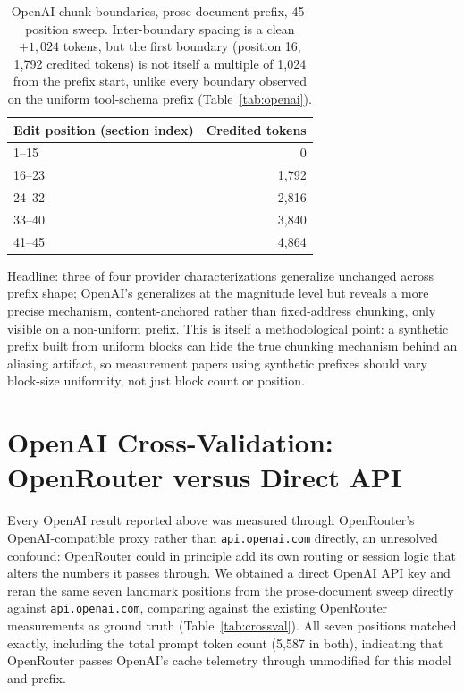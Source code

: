 \documentclass[11pt]{article}
\newcommand{\code}[1]{\texttt{#1}}
\begin{document}
\begin{table}[t]
\centering
\caption{OpenAI chunk boundaries, prose-document prefix, 45-position sweep.
Inter-boundary spacing is a clean $+1{,}024$ tokens, but the first boundary
(position 16, 1{,}792 credited tokens) is not itself a multiple of 1{,}024
from the prefix start, unlike every boundary observed on the uniform
tool-schema prefix (Table~\ref{tab:openai}).}
\label{tab:doc-openai}
\begin{tabular}{@{}lr@{}}
\toprule
Edit position (section index) & Credited tokens \\
\midrule
1--15  & 0 \\
16--23 & 1{,}792 \\
24--32 & 2{,}816 \\
33--40 & 3{,}840 \\
41--45 & 4{,}864 \\
\bottomrule
\end{tabular}
\end{table}

Headline: three of four provider characterizations generalize unchanged
across prefix shape; OpenAI's generalizes at the magnitude level but
reveals a more precise mechanism, content-anchored rather than
fixed-address chunking, only visible on a non-uniform prefix. This is
itself a methodological point: a synthetic prefix built from uniform blocks
can hide the true chunking mechanism behind an aliasing artifact, so
measurement papers using synthetic prefixes should vary block-size
uniformity, not just block count or position.

\section{OpenAI Cross-Validation: OpenRouter versus Direct API}
\label{sec:crossvalidation}

Every OpenAI result reported above was measured through OpenRouter's
OpenAI-compatible proxy rather than \code{api.openai.com} directly, an
unresolved confound: OpenRouter could in principle add its own routing or
session logic that alters the numbers it passes through. We obtained a
direct OpenAI API key and reran the same seven landmark positions from the
prose-document sweep directly against \code{api.openai.com}, comparing
against the existing OpenRouter measurements as ground truth
(Table~\ref{tab:crossval}). All seven positions matched exactly, including
the total prompt token count (5{,}587 in both), indicating that OpenRouter
passes OpenAI's cache telemetry through unmodified for this model and
prefix.
\end{document}
